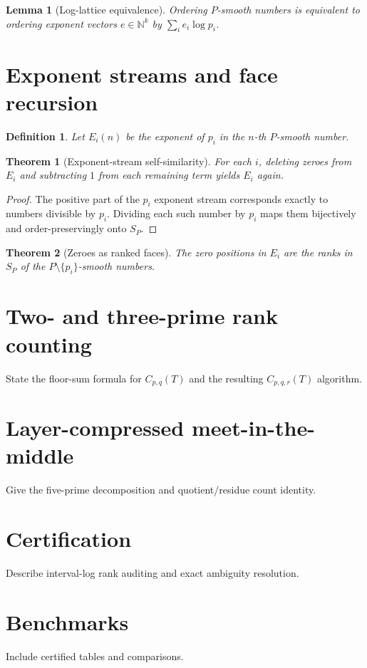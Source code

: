 \documentclass[11pt]{article}
\newtheorem{theorem}{Theorem}
\newtheorem{lemma}{Lemma}
\newtheorem{definition}{Definition}
\begin{document}
\begin{lemma}[Log-lattice equivalence]
Ordering $P$-smooth numbers is equivalent to ordering exponent vectors $e\in\mathbb N^k$ by $\sum_i e_i\log p_i$.
\end{lemma}

\section{Exponent streams and face recursion}
\begin{definition}
Let $E_i(n)$ be the exponent of $p_i$ in the $n$-th $P$-smooth number.
\end{definition}

\begin{theorem}[Exponent-stream self-similarity]
For each $i$, deleting zeroes from $E_i$ and subtracting $1$ from each remaining term yields $E_i$ again.
\end{theorem}
\begin{proof}
The positive part of the $p_i$ exponent stream corresponds exactly to numbers divisible by $p_i$. Dividing each such number by $p_i$ maps them bijectively and order-preservingly onto $S_P$.
\end{proof}

\begin{theorem}[Zeroes as ranked faces]
The zero positions in $E_i$ are the ranks in $S_P$ of the $P\setminus\{p_i\}$-smooth numbers.
\end{theorem}

\section{Two- and three-prime rank counting}
State the floor-sum formula for $C_{p,q}(T)$ and the resulting $C_{p,q,r}(T)$ algorithm.

\section{Layer-compressed meet-in-the-middle}
Give the five-prime decomposition and quotient/residue count identity.

\section{Certification}
Describe interval-log rank auditing and exact ambiguity resolution.

\section{Benchmarks}
Include certified tables and comparisons.
\end{document}
